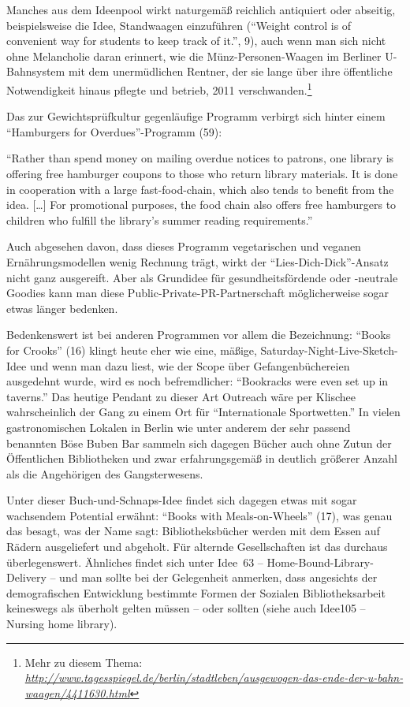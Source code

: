 \documentclass[a4paper,
fontsize=11pt,
oneside,
numbers=noperiodatend,
parskip=half-,
bibliography=totoc,
final
]{scrartcl}
\begin{document}
Manches aus dem Ideenpool wirkt naturgemäß reichlich antiquiert oder
abseitig, beispielsweise die Idee, Standwaagen einzuführen
(\enquote{Weight control is of convenient way for students to keep track
of it.}, 9), auch wenn man sich nicht ohne Melancholie daran erinnert,
wie die Münz-Personen-Waagen im Berliner U-Bahnsystem mit dem
unermüdlichen Rentner, der sie lange über ihre öffentliche Notwendigkeit
hinaus pflegte und betrieb, 2011 verschwanden.\footnote{Mehr zu diesem
  Thema:
  \href{http://www.tagesspiegel.de/berlin/stadtleben/ausgewogen-das-ende-der-u-bahn-waagen/4411630.html}{\emph{http://www.tagesspiegel.de/berlin/stadtleben/ausgewogen-das-ende-der-u-bahn-waagen/4411630.html}}}

Das zur Gewichtsprüfkultur gegenläufige Programm verbirgt sich hinter
einem \enquote{Hamburgers for Overdues}-Programm (59):

\enquote{Rather than spend money on mailing overdue notices to patrons,
one library is offering free hamburger coupons to those who return
library materials. It is done in cooperation with a large
fast-food-chain, which also tends to benefit from the idea.
{[}\ldots{}{]} For promotional purposes, the food chain also offers free
hamburgers to children who fulfill the library's summer reading
requirements.}

Auch abgesehen davon, dass dieses Programm vegetarischen und veganen
Ernährungsmodellen wenig Rechnung trägt, wirkt der
\enquote{Lies-Dich-Dick}-Ansatz nicht ganz ausgereift. Aber als
Grundidee für gesundheitsfördende oder -neutrale Goodies kann man diese
Public-Private-PR-Partnerschaft möglicherweise sogar etwas länger
bedenken.

Bedenkenswert ist bei anderen Programmen vor allem die Bezeichnung:
\enquote{Books for Crooks} (16) klingt heute eher wie eine, mäßige,
Saturday-Night-Live-Sketch-Idee und wenn man dazu liest, wie der Scope
über Gefangenbüchereien ausgedehnt wurde, wird es noch befremdlicher:
\enquote{Bookracks were even set up in taverns.} Das heutige Pendant zu
dieser Art Outreach wäre per Klischee wahrscheinlich der Gang zu einem
Ort für \enquote{Internationale Sportwetten.} In vielen gastronomischen
Lokalen in Berlin wie unter anderem der sehr passend benannten Böse
Buben Bar sammeln sich dagegen Bücher auch ohne Zutun der Öffentlichen
Bibliotheken und zwar erfahrungsgemäß in deutlich größerer Anzahl als
die Angehörigen des Gangsterwesens.

Unter dieser Buch-und-Schnaps-Idee findet sich dagegen etwas mit sogar
wachsendem Potential erwähnt: \enquote{Books with Meals-on-Wheels} (17),
was genau das besagt, was der Name sagt: Bibliotheksbücher werden mit
dem Essen auf Rädern ausgeliefert und abgeholt. Für alternde
Gesellschaften ist das durchaus überlegenswert. Ähnliches findet sich
unter Idee~63 -- Home-Bound-Library-Delivery -- und man sollte bei der
Gelegenheit anmerken, dass angesichts der demografischen Entwicklung
bestimmte Formen der Sozialen Bibliotheksarbeit keineswegs als überholt
gelten müssen -- oder sollten (siehe auch Idee105 -- Nursing home
library).
\end{document}
